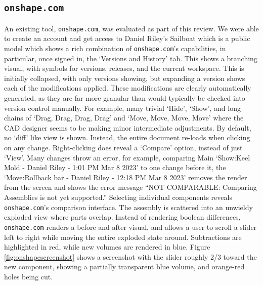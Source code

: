 \documentclass[sigconf,authorversion,nonacm]{acmart}
\begin{document}

\subsection{\texttt{onshape.com}}

An existing tool, \texttt{onshape.com}, was evaluated as part of this review.
We were able to create an account and get access to Daniel Riley's Sailboat
which is a public model which shows a rich combination of \texttt{onshape.com}'s capabilities, in particular, once signed in, the `Versions and History' tab.
This shows a branching visual, with symbols for versions, releases, and the current workspace.
This is initially collapsed, with only versions showing, but expanding a version shows each of the modifications applied.
These modifications are clearly automatically generated, as they are far more granular than would typically be checked into version control manually.
For example, many trivial `Hide', `Show', and long chains of `Drag, Drag, Drag, Drag' and `Move, Move, Move, Move' where the CAD designer seems to be making minor intermediate adjustments.
By default, no `diff' like view is shown.
Instead, the entire document re-loads when clicking on any change.
Right-clicking does reveal a `Compare' option, instead of just `View'.
Many changes throw an error, for example, comparing Main `Show:Keel Mold - Daniel Riley - 1:01 PM Mar 8 2023' to one change before it, the `Move:Rollback bar - Daniel Riley - 12:18 PM Mar 8 2023' removes the render from the screen and shows the error message ``NOT COMPARABLE: Comparing Assemblies is not yet supported.''
Selecting individual components reveals \texttt{onshape.com}'s comparison interface.
The assembly is scattered into an unwieldy exploded view where parts overlap.
Instead of rendering boolean differences, \texttt{onshape.com} renders a before and after visual, and allows a user to scroll a slider left to right while moving the entire exploded state around.
Subtractions are highlighted in red, while new volumes are rendered in blue.
Figure \ref{fig:onshapescreenshot} shows a screenshot with the slider roughly 2/3 toward the new component, showing a partially transparent blue volume, and orange-red holes being cut.
\end{document}
